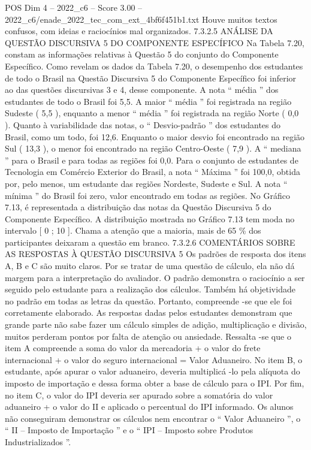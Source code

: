 \begin{textsample}{POS Dim 4 – 2022\_c6 – Score 3.00 – 2022\_c6/enade\_2022\_tec\_com\_ext\_4bf6f451b1.txt}
Houve muitos textos confusos, com ideias e raciocínios mal organizados. 7.3.2.5 ANÁLISE DA QUESTÃO DISCURSIVA 5 DO COMPONENTE ESPECÍFICO Na Tabela 7.20, constam as informações relativas à Questão 5 do conjunto do Componente Específico.
Como revelam os dados da Tabela 7.20, o desempenho dos estudantes de todo o Brasil na Questão Discursiva 5 do Componente Específico foi inferior ao das questões discursivas 3 e 4, desse componente.
A nota “ média ” dos estudantes de todo o Brasil foi 5,5.
A maior “ média ” foi registrada na região Sudeste ( 5,5 ), enquanto a menor “ média ” foi registrada na região Norte ( 0,0 ).
Quanto à variabilidade das notas, o “ Desvio-padrão ” dos estudantes do Brasil, como um todo, foi 12,6.
Enquanto o maior desvio foi encontrado na região Sul ( 13,3 ), o menor foi encontrado na região Centro-Oeste ( 7,9 ).
A “ mediana ” para o Brasil e para todas as regiões foi 0,0.
Para o conjunto de estudantes de Tecnologia em Comércio Exterior do Brasil, a nota “ Máxima ” foi 100,0, obtida por, pelo menos, um estudante das regiões Nordeste, Sudeste e Sul.
A nota “ mínima ” do Brasil foi zero, valor encontrado em todas as regiões.
No Gráfico 7.13, é representada a distribuição das notas da Questão Discursiva 5 do Componente Específico.
A distribuição mostrada no Gráfico 7.13 tem moda no intervalo [ 0 ; 10 ].
Chama a atenção que a maioria, mais de 65 \% dos participantes deixaram a questão em branco. 7.3.2.6 COMENTÁRIOS SOBRE AS RESPOSTAS À QUESTÃO DISCURSIVA 5 Os padrões de resposta dos itens A, B e C são muito claros.
Por se tratar de uma questão de cálculo, ela não dá margem para a interpretação do avaliador.
O padrão demonstra o raciocínio a ser seguido pelo estudante para a realização dos cálculos.
Também há objetividade no padrão em todas as letras da questão.
Portanto, compreende -se que ele foi corretamente elaborado.
As respostas dadas pelos estudantes demonstram que grande parte não sabe fazer um cálculo simples de adição, multiplicação e divisão, muitos perderam pontos por falta de atenção ou ansiedade.
Ressalta -se que o item A compreende a soma do valor da mercadoria + o valor do frete internacional + o valor do seguro internacional = Valor Aduaneiro.
No item B, o estudante, após apurar o valor aduaneiro, deveria multiplicá -lo pela alíquota do imposto de importação e dessa forma obter a base de cálculo para o IPI.
Por fim, no item C, o valor do IPI deveria ser apurado sobre a somatória do valor aduaneiro + o valor do II e aplicado o percentual do IPI informado.
Os alunos não conseguiram demonstrar os cálculos nem encontrar o “ Valor Aduaneiro ”, o “ II – Imposto de Importação ” e o “ IPI – Imposto sobre Produtos Industrializados ”.

\end{textsample}
